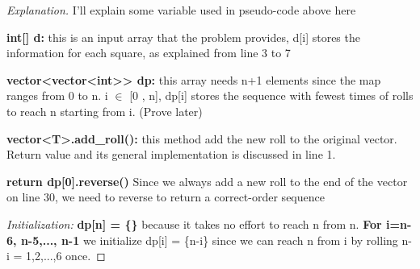 \documentclass[openany]{article}
\begin{document}
\begin{proof}[Explanation]{}
		\renewcommand{\qedsymbol}{} %
        I'll explain some variable used in pseudo-code above here

        \textbf{int[] d:} this is an input array that the problem provides, d[i] stores the information for each square, as explained from line 3 to 7
        
        \textbf{vector<vector<int>> dp:} this array needs n+1 elements since the map ranges from 0 to n. i $\in$ [0 , n], dp[i] stores the sequence with fewest times of rolls to reach n starting from i. (Prove later)
        
        \textbf{vector<T>.add\_roll():} this method add the new roll to the original vector. Return value and its general implementation is discussed in line 1.
        
        \textbf{return dp[0].reverse()} Since we always add a new roll to the end of the vector on line 30, we need to reverse to return a correct-order sequence
        
        \textit{Initialization:} \textbf{dp[n] = \{\}} because it takes no effort to reach n from n. \textbf{For i=n-6, n-5,..., n-1} we initialize dp[i] = \{n-i\} since we can reach n from i by rolling n-i = 1,2,...,6 once.

       
\end{proof}
\end{document}
